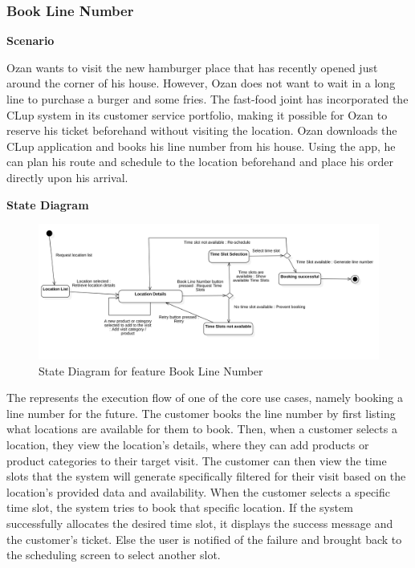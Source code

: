 \subsubsection{Book Line Number}

\textbf{Scenario}

Ozan wants to visit the new hamburger place that has recently opened just around the corner of his house.
However, Ozan does not want to wait in a long line to purchase a burger and some fries.
The fast-food joint has incorporated the CLup system in its customer service portfolio, making it possible for Ozan to reserve his ticket beforehand without visiting the location.
Ozan downloads the CLup application and books his line number from his house.
Using the app, he can plan his route and schedule to the location beforehand and place his order directly upon his arrival.

\textbf{State Diagram}

\begin{figure}[H]
    \centering
    \includegraphics[height=0.4\textwidth]{Images/StateCharts/BookLineNumber.png}
    \caption{State Diagram for feature Book Line Number}
    \label{fig:SDBookLine}
\end{figure}

The  represents the execution flow of one of the core use cases, namely booking a line number for the future.
The customer books the line number by first listing what locations are available for them to book.
Then, when a customer selects a location, they view the location's details, where they can add products or product categories to their target visit.
The customer can then view the time slots that the system will generate specifically filtered for their visit based on the location's provided data and availability.
When the customer selects a specific time slot, the system tries to book that specific location.
If the system successfully allocates the desired time slot, it displays the success message and the customer's ticket.
Else the user is notified of the failure and brought back to the scheduling screen to select another slot.



